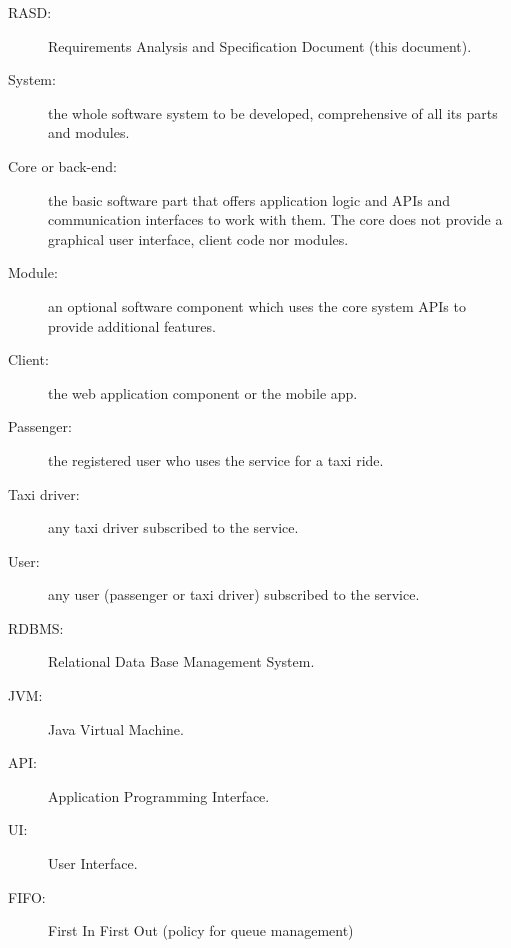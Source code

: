\begin{description}
\item[RASD:] Requirements Analysis and Specification Document (this document).
\item[System:] the whole software system to be developed, comprehensive of all its parts and modules.
\item[Core or back-end:] the basic software part that offers application logic and APIs and communication interfaces to work with them. The core does not provide a graphical user interface, client code nor modules.
\item[Module:] an optional software component which uses the core system APIs to provide additional features.
\item[Client:] the web application component or the mobile app.
\item[Passenger:] the registered user who uses the service for a taxi ride.
\item[Taxi driver:] any taxi driver subscribed to the service.
\item[User:] any user (passenger or taxi driver) subscribed to the service.
\item[RDBMS:] Relational Data Base Management System.
\item[JVM:] Java Virtual Machine.
\item[API:] Application Programming Interface.
\item[UI:] User Interface.
\item[FIFO:] First In First Out (policy for queue management)
\end{description}
